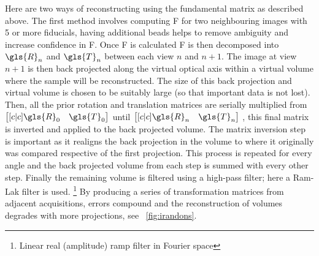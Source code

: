 Here are two ways of reconstructing using the \gls{fundamental matrix} as described above.
The first method involves computing \gls{F} for two neighbouring images with 5 or more fiducials, having additional beads helps to remove ambiguity and increase confidence in \gls{F}.
Once \gls{F} is calculated \gls{F} is then decomposed into \(\gls{R}_n\) and \(\gls{T}_n\) between each view \(n\) and \(n+1\).
The image at view \(n+1\) is then back projected along the virtual optical axis within a virtual volume where the sample will be reconstructed.
The size of this back projection and virtual volume is chosen to be suitably large (so that important data is not lost).
Then, all the prior rotation and translation matrices are serially multiplied from \(\begin{bmatrix}[c|c] \gls{R}_0&\gls{T}_0 \end{bmatrix}\) until \(\begin{bmatrix}[c|c] \gls{R}_n&\gls{T}_n \end{bmatrix}\) %
, this final matrix is inverted and applied to the back projected volume.
The matrix inversion step is important as it realigns the back projection in the volume to where it originally was compared respective of the first projection.
This process is repeated for every angle and the back projected volume from each step is summed with every other step.
Finally the remaining volume is filtered using a high-pass filter; here a \gls{Ram-Lak filter} is used.
\footnote{Linear real (amplitude) ramp filter in Fourier space}%
By producing a series of transformation matrices from adjacent acquisitions, errors compound and the reconstruction of volumes degrades with more projections, see \figurename~\ref{fig:irandons}.

